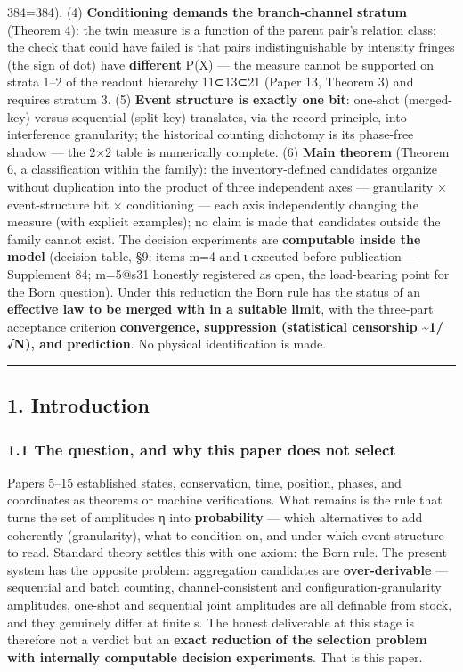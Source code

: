 \documentclass[
]{ltjsarticle}
\begin{document}
384=384). (4) \textbf{Conditioning demands the branch-channel stratum}
(Theorem 4): the twin measure is a function of the parent pair's
relation class; the check that could have failed is that pairs
indistinguishable by intensity fringes (the sign of dot) have
\textbf{different} P(X) --- the measure cannot be supported on strata
1--2 of the readout hierarchy 11⊂13⊂21 (Paper 13, Theorem 3) and
requires stratum 3. (5) \textbf{Event structure is exactly one bit}:
one-shot (merged-key) versus sequential (split-key) translates, via the
record principle, into interference granularity; the historical counting
dichotomy is its phase-free shadow --- the 2×2 table is numerically
complete. (6) \textbf{Main theorem} (Theorem 6, a classification within
the family): the inventory-defined candidates organize without
duplication into the product of three independent axes --- granularity ×
event-structure bit × conditioning --- each axis independently changing
the measure (with explicit examples); no claim is made that candidates
outside the family cannot exist. The decision experiments are
\textbf{computable inside the model} (decision table, §9; items m=4 and
ι executed before publication --- Supplement 84; m=5@s31 honestly
registered as open, the load-bearing point for the Born question). Under
this reduction the Born rule has the status of an \textbf{effective law
to be merged with in a suitable limit}, with the three-part acceptance
criterion \textbf{convergence, suppression (statistical censorship
\textasciitilde1/√N), and prediction}. No physical identification is
made.

\begin{center}\rule{0.5\linewidth}{0.5pt}\end{center}

\subsection{1. Introduction}\label{introduction}

\subsubsection{1.1 The question, and why this paper does not
select}\label{the-question-and-why-this-paper-does-not-select}

Papers 5--15 established states, conservation, time, position, phases,
and coordinates as theorems or machine verifications. What remains is
the rule that turns the set of amplitudes η into \textbf{probability}
--- which alternatives to add coherently (granularity), what to
condition on, and under which event structure to read. Standard theory
settles this with one axiom: the Born rule. The present system has the
opposite problem: aggregation candidates are \textbf{over-derivable} ---
sequential and batch counting, channel-consistent and
configuration-granularity amplitudes, one-shot and sequential joint
amplitudes are all definable from stock, and they genuinely differ at
finite s. The honest deliverable at this stage is therefore not a
verdict but an \textbf{exact reduction of the selection problem with
internally computable decision experiments}. That is this paper.
\end{document}
